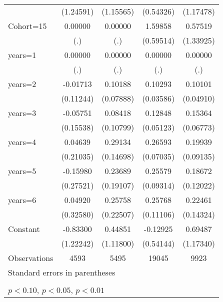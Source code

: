 \begin{table}[htbp]
\begin{tabular}{l*{4}{c}}
                    &   (1.24591)         &   (1.15565)         &   (0.54326)         &   (1.17478)         \\
\addlinespace
Cohort=15           &     0.00000         &     0.00000         &     1.59858\sym{***}&     0.57519         \\
                    &         (.)         &         (.)         &   (0.59514)         &   (1.33925)         \\
\addlinespace
years=1             &     0.00000         &     0.00000         &     0.00000         &     0.00000         \\
                    &         (.)         &         (.)         &         (.)         &         (.)         \\
\addlinespace
years=2             &    -0.01713         &     0.10188         &     0.10293\sym{***}&     0.10101\sym{**} \\
                    &   (0.11244)         &   (0.07888)         &   (0.03586)         &   (0.04910)         \\
\addlinespace
years=3             &    -0.05751         &     0.08418         &     0.12848\sym{**} &     0.15364\sym{**} \\
                    &   (0.15538)         &   (0.10799)         &   (0.05123)         &   (0.06773)         \\
\addlinespace
years=4             &     0.04639         &     0.29134\sym{**} &     0.26593\sym{***}&     0.19939\sym{**} \\
                    &   (0.21035)         &   (0.14698)         &   (0.07035)         &   (0.09135)         \\
\addlinespace
years=5             &    -0.15980         &     0.23689         &     0.25579\sym{***}&     0.18672         \\
                    &   (0.27521)         &   (0.19107)         &   (0.09314)         &   (0.12022)         \\
\addlinespace
years=6             &     0.04920         &     0.25758         &     0.25768\sym{**} &     0.22461         \\
                    &   (0.32580)         &   (0.22507)         &   (0.11106)         &   (0.14324)         \\
\addlinespace
Constant            &    -0.83300         &     0.44851         &    -0.12925         &     0.69487         \\
                    &   (1.22242)         &   (1.11800)         &   (0.54144)         &   (1.17340)         \\
\midrule
Observations        &        4593         &        5495         &       19045         &        9923         \\
\bottomrule
\multicolumn{5}{l}{\footnotesize Standard errors in parentheses}\\
\multicolumn{5}{l}{\footnotesize }\\
\multicolumn{5}{l}{\footnotesize \sym{*} \(p<0.10\), \sym{**} \(p<0.05\), \sym{***} \(p<0.01\)}\\
\end{tabular}
\end{table}
